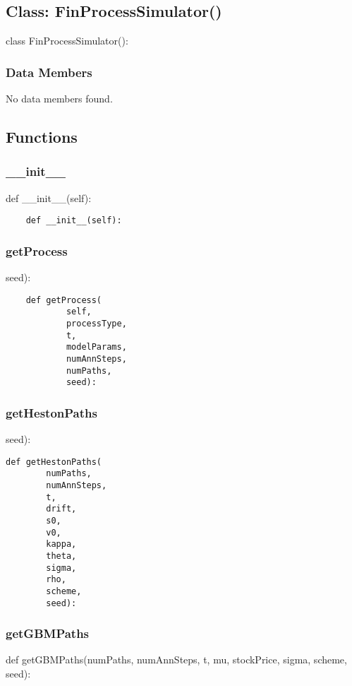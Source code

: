 \documentclass[twoside,11pt]{book}
\begin{document}
\subsection*{Class: FinProcessSimulator()}
class FinProcessSimulator(): 

\subsubsection*{Data Members}
No data members found.

\subsection*{Functions}

\subsubsection*{{\bf \_\_init\_\_}}
def \_\_init\_\_(self): 

\begin{lstlisting}
    def __init__(self):
\end{lstlisting}

\subsubsection*{{\bf getProcess}}
seed): 

\begin{lstlisting}
    def getProcess(
            self,
            processType,
            t,
            modelParams,
            numAnnSteps,
            numPaths,
            seed):
\end{lstlisting}

\subsubsection*{{\bf getHestonPaths}}
seed): 

\begin{lstlisting}
def getHestonPaths(
        numPaths,
        numAnnSteps,
        t,
        drift,
        s0,
        v0,
        kappa,
        theta,
        sigma,
        rho,
        scheme,
        seed):
\end{lstlisting}

\subsubsection*{{\bf getGBMPaths}}
def getGBMPaths(numPaths, numAnnSteps, t, mu, stockPrice, sigma, scheme, seed): 
\end{document}
